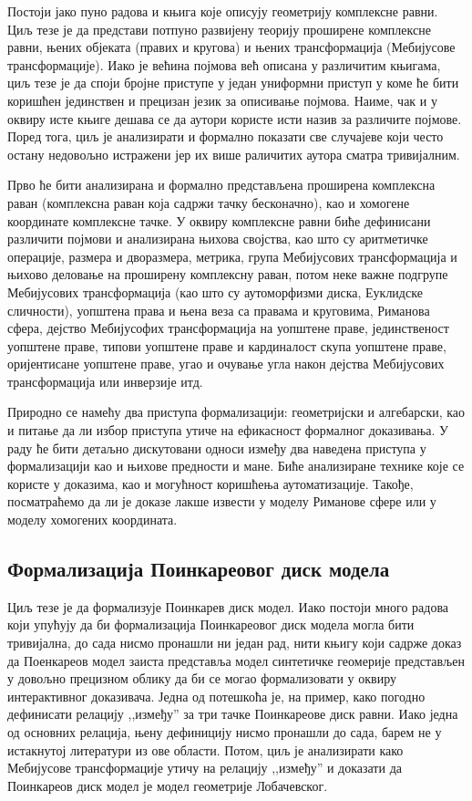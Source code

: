 \documentclass[11pt]{article}
\begin{document}
Постоји јако пуно радова и књига које описују геометрију комплексне
равни. Циљ тезе је да представи потпуно развијену теорију проширене
комплексне равни, њених објеката (правих и кругова) и њених
трансформација (Мебијусове трансформације). Иако је већина појмова већ
описана у различитим књигама, циљ тезе је да споји бројне приступе у
један униформни приступ у коме ће бити коришћен јединствен и прецизан
језик за описивање појмова.  Наиме, чак и у оквиру исте књиге дешава
се да аутори користе исти назив за различите појмове.  Поред тога, циљ
је анализирати и формално показати све случајеве који често остану
недовољно истражени јер их више раличитих аутора сматра
тривијалним. 

Прво ће бити анализирана и формално представљена проширена комплексна
раван (ко\-мпле\-ксна раван која садржи тачку бесконачно), као и
хомогене координате комплексне тачке. У оквиру комплексне равни биће
дефинисани различити појмови и анализирана њихова сво\-јства, као што
су аритметичке операције, размера и дворазмера, метрика, група
Ме\-би\-ју\-со\-вих тра\-нсфор\-ма\-ци\-ја и њихово деловање на
проширену комплексну раван, потом неке важне подгрупе Мебијусових
тра\-нсфо\-рма\-ци\-ја (као што су аутоморфизми диска, Еуклидске
сли\-чно\-сти), уопштена права и њена веза са правама и круговима,
Риманова сфера, дејство Мебијусофих трансформација на уопштене праве,
јединственост уопштене праве, типови уо\-пште\-не праве и кардиналост
скупа уопштене праве, оријентисане уопштене праве, угао и очување угла
након дејства Мебијусових трансформација или инверзије итд.

Природно се намећу два приступа формализацији: геометријски и
алгебарски, као и питање да ли избор приступа утиче на ефикасност
формалног доказивања. У раду ће бити детаљно дискутовани односи између
два наведена приступа у формализацији као и њихове предности и
мане. Биће анализиране технике које се користе у доказима, као и
могућност коришћења аутоматизације. Такође, посматраћемо да ли је
доказе лакше извести у моделу Риманове сфере или у моделу хомогених
координата.

\subsection{Формализација Поинкареовог диск модела}

Циљ тезе је да формализује Поинкарев диск модел. Иако постоји много
радова који упућују да би формализација Поинкареовог диск модела могла
бити тривијална, до сада нисмо пронашли ни један рад, нити књигу који
садрже доказ да Поенкареов модел заиста представља модел синтетичке
геомерије представљен у довољно прецизном облику да би се могао
формализовати у оквиру интерактивног доказивача. Једна од потешкоћа
је, на пример, како погодно дефинисати релацију ,,између'' за три
тачке Поинкареове диск равни. Иако једна од основних релација, њену
дефиницију нисмо пронашли до сада, барем не у истакнутој литератури из
ове области. Потом, циљ је анализирати како Мебијусове трансформације
утичу на релацију ,,између'' и доказати да Поинкареов диск модел је
модел геометрије Лобачевског.
\end{document}
